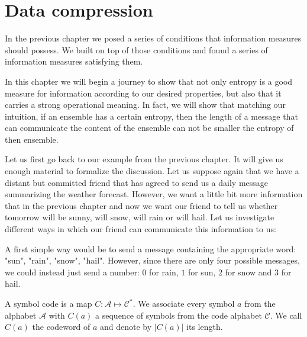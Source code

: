 \usechapterimagetrue
{} 
\chapter{Data compression}
\usechapterimagefalse
In the previous chapter we posed a series of conditions that information measures should possess. We built on top of those conditions and found a series of information measures satisfying them. 

In this chapter we will begin a journey to show that not only entropy is a good measure for information according to our desired properties, but also that it carries a strong operational meaning. In fact, we will show that matching  our intuition, if an ensemble has a certain entropy, then the length of a message that can communicate the content of the ensemble can not be smaller the entropy of then ensemble. 




Let us first go back to our example from the previous chapter. It will give us enough material to formalize the discussion. Let us suppose again that we have a distant but committed friend that has agreed to send us a daily message summarizing the weather forecast. However, we want a little bit more information that in the previous chapter and now we want our friend to tell us whether tomorrow will be sunny, will snow, will rain or will hail. Let us investigate different ways in which our friend can communicate this information to us:

A first simple way would be to send a message containing the appropriate word: "sun", "rain", "snow", "hail". However, since there are only four possible messages, we could instead just send a number: $0$ for rain, $1$ for sun, $2$ for snow and $3$ for hail. 

\begin{definition}
A symbol code is a map $C:\mathcal A\mapsto\mathcal C^*$. We associate every symbol $a$ from the alphabet $\mathcal A$ with $C(a)$ a sequence of symbols from the code alphabet $\mathcal C$. We call $C(a)$ the codeword of $a$ and denote by $|C(a)|$ its length. %
\end{definition}

